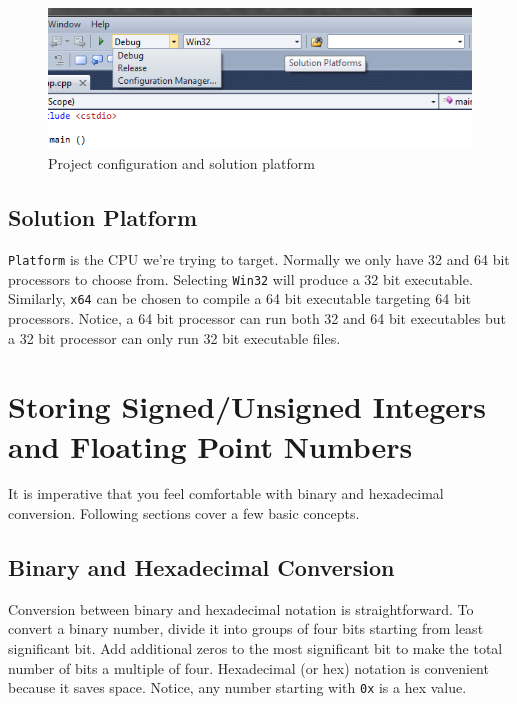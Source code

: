 \documentclass[12pt,a4paper]{article}
\begin{document}
\begin{figure}[H]
\centering
\label{Configuration-Platform}
\includegraphics[scale=0.6]{ConfigurationPlatform.png}
\caption{Project configuration and solution platform}
\end{figure}

\subsection{Solution Platform}
\verb|Platform| is the CPU we're trying to target. Normally we only have 32 and 64 bit processors to choose from. Selecting \verb|Win32| will produce a 32 bit executable. Similarly, \verb|x64| can be chosen to compile a 64 bit executable targeting 64 bit processors. Notice, a 64 bit processor can run both 32 and 64 bit executables but a 32 bit processor can only run 32 bit executable files.

\section{Storing Signed/Unsigned Integers and Floating Point Numbers}
It is imperative that you feel comfortable with binary and hexadecimal conversion. Following sections cover a few basic concepts.

\subsection{Binary and Hexadecimal Conversion}
Conversion between binary and hexadecimal notation is straightforward. To convert a binary number, divide it into groups of four bits starting from least significant bit. Add additional zeros to the most significant bit to make the total number of bits a multiple of four. Hexadecimal (or hex) notation is convenient because it saves space. Notice, any number starting with \verb|0x| is a hex value.
\end{document}
